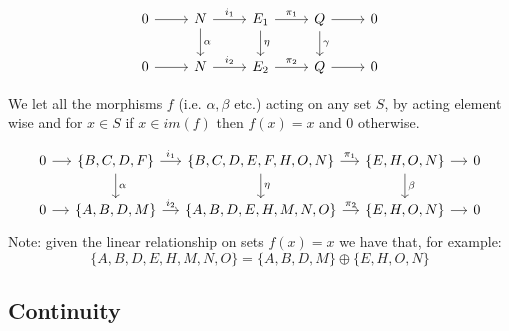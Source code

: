\documentclass[12pt]{report}
\begin{document}
\[
\begin{tikzcd}
0 \ar{r} & N \ar{r}{i_1} \ar{d}{\alpha} & E_1 \ar{r}{\pi_1} \ar{d}{\eta} & Q \ar{r} \ar{d}{\gamma} &0 \\
0 \ar{r} & N \ar{r}{i_2} & E_2 \ar{r}{\pi_2} & Q \ar{r} & 0
\end{tikzcd}
\]

We let all the morphisms $f$ (i.e. $\alpha,\beta$ etc.) acting on any set $S$, by acting element wise and for $x \in S$ if $x \in im(f)$ then $f(x) = x$ and $0$ otherwise.

\[
\begin{tikzcd}[column sep=small]
0 \arrow{r} & \{B,C,D,F\} \ar{r}{i_1} \ar{d}{\alpha} & \{B,C,D,E,F,H,O,N \} \ar{r}{\pi_1} \ar{d}{\eta} & \{E,H,O,N\} \ar{r} \ar{d}{\beta} &0 \\
0 \ar{r} & \{A,B,D,M\}  \ar{r}{i_2} & \{A,B,D,E,H,M,N,O\}  \ar{r}{\pi_2} & \{E,H,O,N\}\ar{r} & 0
\end{tikzcd}
\]
Note: given the linear relationship on sets $f(x) = x$ we have that, for example: 
$$ \{A,B,D,E,H,M,N,O\} = \{A,B,D,M\} \oplus \{E,H,O,N\}$$

\subsection{Continuity}
\end{document}
